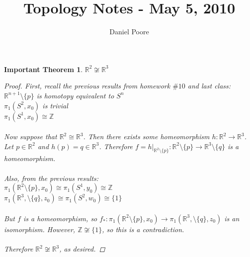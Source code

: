 \documentclass[11pt]{article}
\title{Topology Notes - May 5, 2010}
\author{Daniel Poore}
\date{}                                           %
\newtheorem{theorem}{Important Theorem}
\newcommand{\R}[0]{\mathbb{R}}
\newcommand{\Z}[0]{\mathbb{Z}}
\begin{document}
\maketitle

\begin{theorem} $\R^2 \not \cong \R^3$
\begin{proof}
First, recall the previous results from homework $\#10$ and last class:
\\
\indent $\R^{n+1} \setminus \{p\}$ is homotopy equivalent to $S^n$
\\
\indent $\pi_1(S^2, x_0)$ is trivial
\\
\indent $\pi_1(S^1, x_0) \cong \Z$
\\
\\
Now suppose that $\R^2 \cong \R^3$.  Then there exists some homeomorphism $h : \R^2 \to \R^3$.  
\\
Let $p \in \R^2$ and $h(p) = q \in \R^3$.  Therefore $f = h|_{\R^2\setminus\{p\}} :\R^2\setminus\{p\} \to \R^3\setminus\{q\}$ is a homeomorphism.
\\
\\
Also, from the previous results:
\\
\indent $\pi_1(\R^2 \setminus \{p\}, x_0) \cong \pi_1(S^1, y_0) \cong \Z$
\\
\indent $\pi_1(\R^3, \setminus \{q\}, z_0) \cong \pi_1(S^2, w_0) \cong \{1\}$
\\
\\
But $f$ is a homeomorphism, so $f_* : \pi_1(\R^2 \setminus \{p\}, x_0) \to \pi_1(\R^3, \setminus \{q\}, z_0)$ is an isomorphism.  However, $\Z \not \cong \{1\}$, so this is a contradiction.  
\\
\\
Therefore $\R^2 \not \cong \R^3$, as desired.
\end{proof}

\end{theorem}
\end{document}
